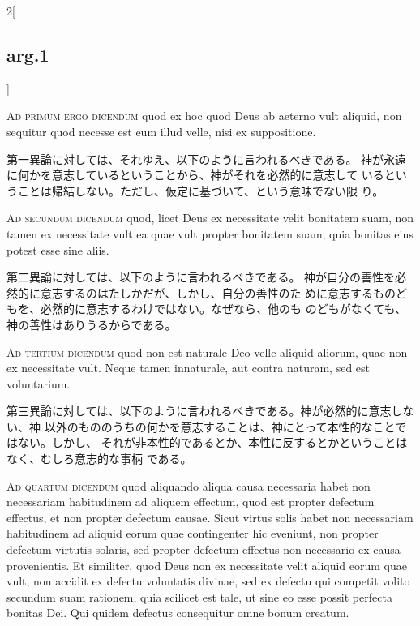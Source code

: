 \documentclass[paper=a4paper,fontsize=10pt,jafontsize=9pt,titlepage]{jlreq}
\begin{document}
\begin{paracol}{2}[\subsection{arg.1}]
\switchcolumn*[\subsection{ad.1}]


{\scshape Ad primum ergo dicendum} quod ex hoc quod Deus
ab aeterno vult aliquid, non sequitur quod necesse est eum illud velle,
nisi ex suppositione.

\switchcolumn

第一異論に対しては、それゆえ、以下のように言われるべきである。
 神が永遠に何かを意志しているということから、神がそれを必然的に意志して
 いるということは帰結しない。ただし、仮定に基づいて、という意味でない限
 り。

\switchcolumn*[\subsection{ad.2}]


{\scshape Ad secundum dicendum} quod, licet Deus ex
necessitate velit bonitatem suam, non tamen ex necessitate vult ea quae
vult propter bonitatem suam, quia bonitas eius potest esse sine aliis.

\switchcolumn

第二異論に対しては、以下のように言われるべきである。
 神が自分の善性を必然的に意志するのはたしかだが、しかし、自分の善性のた
 めに意志するものどもを、必然的に意志するわけではない。なぜなら、他のも
 のどもがなくても、神の善性はありうるからである。

\switchcolumn*[\subsection{ad.3}]


{\scshape Ad tertium dicendum} quod non est naturale Deo
velle aliquid aliorum, quae non ex necessitate vult. Neque tamen
innaturale, aut contra naturam, sed est voluntarium.

\switchcolumn

第三異論に対しては、以下のように言われるべきである。神が必然的に意志しない、神
 以外のもののうちの何かを意志することは、神にとって本性的なことではない。しかし、
 それが非本性的であるとか、本性に反するとかということはなく、むしろ意志的な事柄
 である。

\switchcolumn*[\subsection{ad.4}]


{\scshape Ad quartum dicendum} quod aliquando aliqua
causa necessaria habet non necessariam habitudinem ad aliquem effectum,
quod est propter defectum effectus, et non propter defectum
causae. Sicut virtus solis habet non necessariam habitudinem ad aliquid
eorum quae contingenter hic eveniunt, non propter defectum virtutis
solaris, sed propter defectum effectus non necessario ex causa
provenientis. Et similiter, quod Deus non ex necessitate velit aliquid
eorum quae vult, non accidit ex defectu voluntatis divinae, sed ex
defectu qui competit volito secundum suam rationem, quia scilicet est
tale, ut sine eo esse possit perfecta bonitas Dei. Qui quidem defectus
consequitur omne bonum creatum.


\end{paracol}
\end{document}
